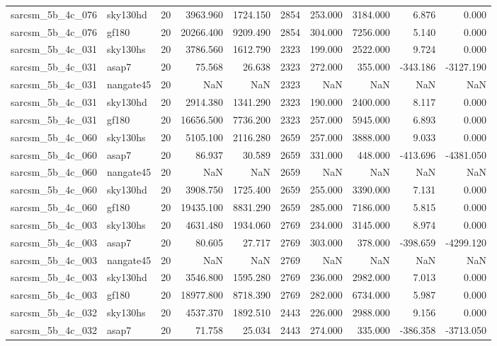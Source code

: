 \documentclass{article}
\begin{document}
\begin{longtable}{llrrrrrrrr}
sarcsm\_5b\_4c\_076 & sky130hd & 20 & 3963.960 & 1724.150 & 2854 & 253.000 & 3184.000 & 6.876 & 0.000 \\
sarcsm\_5b\_4c\_076 & gf180 & 20 & 20266.400 & 9209.490 & 2854 & 304.000 & 7256.000 & 5.140 & 0.000 \\
sarcsm\_5b\_4c\_031 & sky130hs & 20 & 3786.560 & 1612.790 & 2323 & 199.000 & 2522.000 & 9.724 & 0.000 \\
sarcsm\_5b\_4c\_031 & asap7 & 20 & 75.568 & 26.638 & 2323 & 272.000 & 355.000 & -343.186 & -3127.190 \\
sarcsm\_5b\_4c\_031 & nangate45 & 20 & NaN & NaN & 2323 & NaN & NaN & NaN & NaN \\
sarcsm\_5b\_4c\_031 & sky130hd & 20 & 2914.380 & 1341.290 & 2323 & 190.000 & 2400.000 & 8.117 & 0.000 \\
sarcsm\_5b\_4c\_031 & gf180 & 20 & 16656.500 & 7736.200 & 2323 & 257.000 & 5945.000 & 6.893 & 0.000 \\
sarcsm\_5b\_4c\_060 & sky130hs & 20 & 5105.100 & 2116.280 & 2659 & 257.000 & 3888.000 & 9.033 & 0.000 \\
sarcsm\_5b\_4c\_060 & asap7 & 20 & 86.937 & 30.589 & 2659 & 331.000 & 448.000 & -413.696 & -4381.050 \\
sarcsm\_5b\_4c\_060 & nangate45 & 20 & NaN & NaN & 2659 & NaN & NaN & NaN & NaN \\
sarcsm\_5b\_4c\_060 & sky130hd & 20 & 3908.750 & 1725.400 & 2659 & 255.000 & 3390.000 & 7.131 & 0.000 \\
sarcsm\_5b\_4c\_060 & gf180 & 20 & 19435.100 & 8831.290 & 2659 & 285.000 & 7186.000 & 5.815 & 0.000 \\
sarcsm\_5b\_4c\_003 & sky130hs & 20 & 4631.480 & 1934.060 & 2769 & 234.000 & 3145.000 & 8.974 & 0.000 \\
sarcsm\_5b\_4c\_003 & asap7 & 20 & 80.605 & 27.717 & 2769 & 303.000 & 378.000 & -398.659 & -4299.120 \\
sarcsm\_5b\_4c\_003 & nangate45 & 20 & NaN & NaN & 2769 & NaN & NaN & NaN & NaN \\
sarcsm\_5b\_4c\_003 & sky130hd & 20 & 3546.800 & 1595.280 & 2769 & 236.000 & 2982.000 & 7.013 & 0.000 \\
sarcsm\_5b\_4c\_003 & gf180 & 20 & 18977.800 & 8718.390 & 2769 & 282.000 & 6734.000 & 5.987 & 0.000 \\
sarcsm\_5b\_4c\_032 & sky130hs & 20 & 4537.370 & 1892.510 & 2443 & 226.000 & 2988.000 & 9.156 & 0.000 \\
sarcsm\_5b\_4c\_032 & asap7 & 20 & 71.758 & 25.034 & 2443 & 274.000 & 335.000 & -386.358 & -3713.050 \\

\end{longtable}
\end{document}

